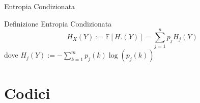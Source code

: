 \documentclass{beamer}
\theoremstyle{definition}
\numberwithin{equation}{section}
\begin{document}
\begin{frame}[t]{Entropia Condizionata} \vspace{5pt}
\begin{block}{Definizione Entropia Condizionata}
\vspace{0.5em}
\begin{equation*}
H_X(Y):= \mathbb{E}[H.(Y)]= \sum_{j=1}^n p_j H_j(Y)
\end{equation*}
dove $H_j(Y):=-\sum_{k=1}^m p_j(k)\log(p_j(k))$
\vspace{0.5em}
\end{block}
\vspace{10pt}
\vspace{20pt}
\end{frame}

\section{Codici}
\end{document}
